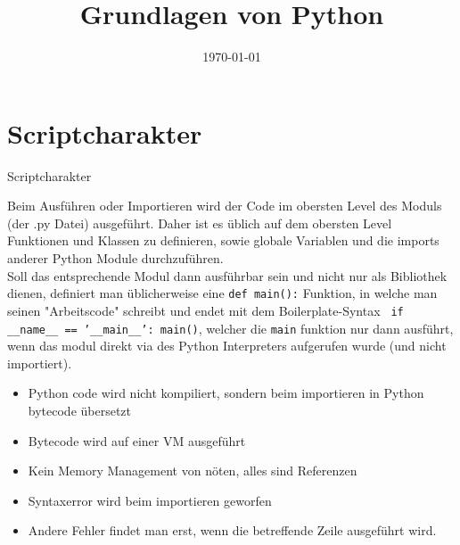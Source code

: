 


\newcommand{\topic}{
	Grundlagen von Python
}

\title{\topic}
\supertitle{\course}
\date{\today}



\maketitle

\begin{frame}
	\tableofcontents
\end{frame}


\section{Scriptcharakter}
\begin{frame}{Scriptcharakter}

Beim Ausführen oder Importieren wird der Code im obersten Level des Moduls (der .py Datei) ausgeführt. Daher ist es üblich auf dem obersten Level Funktionen und Klassen zu definieren, sowie globale Variablen und die imports anderer Python Module durchzuführen. \\
Soll das entsprechende Modul dann ausführbar sein und nicht nur als Bibliothek dienen, definiert man üblicherweise eine \texttt{def main():} Funktion, in welche man seinen
"Arbeitscode" schreibt und endet mit dem Boilerplate-Syntax \texttt{ if __name__ == '__main__': main()}, welcher die \texttt{main} funktion nur dann ausführt, wenn das modul direkt via des Python Interpreters aufgerufen wurde (und nicht importiert).\\

\begin{itemize}
	\item Python code wird nicht kompiliert, sondern beim importieren in Python bytecode übersetzt
	\item Bytecode wird auf einer VM ausgeführt
	\item Kein Memory Management von nöten, alles sind Referenzen
	\item Syntaxerror wird beim importieren geworfen
	\item Andere Fehler findet man erst, wenn die betreffende Zeile ausgeführt wird.
\end{itemize}


\end{frame}

